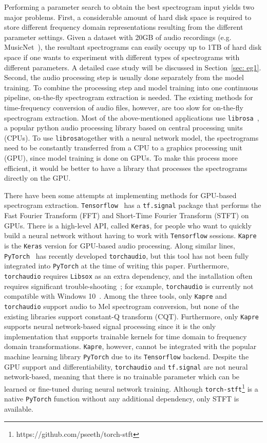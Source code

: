 \documentclass{ieeeaccess}
\newcommand{\nbh}[1]{\texttt{#1}}
\begin{document}
Performing a parameter search to obtain the best spectrogram input yields two major problems. First, a considerable amount of hard disk space is required to store different frequency domain representations resulting from the different parameter settings. Given a dataset with 20GB of audio recordings (e.g. MusicNet~\cite{thickstun2017learning}), the resultant spectrograms can easily occupy up to 1TB of hard disk space {if one wants to experiment with different types of spectrograms with different parameters}. {A detailed case study will be discussed in Section~\ref{sec: eg1}. Second, the audio processing step is usually done separately from the model training. To combine the processing step and model training into one continuous pipeline, on-the-fly spectrogram extraction is needed.} The existing methods for time-frequency conversion of audio files, however, are too slow for on-the-fly spectrogram extraction. Most of the above-mentioned applications use \nbh{librosa}~\cite{mcfee2015Librosa}, a popular python audio processing library based on central processing units (CPUs). To use \nbh{librosa}together with a neural network model, the spectrograms need to be constantly transferred from a CPU to a graphics processing unit (GPU), since model training is done on GPUs. To make this process more efficient, it would be better to have a library that processes the spectrograms directly on the GPU.

{There have been some attempts at implementing methods for GPU-based spectrogram extraction. \nbh{Tensorflow}~\cite{Tensorflow2015-whitepaper} has a \nbh{tf.signal} package that performs the Fast Fourier Transform (FFT) and Short-Time Fourier Transform (STFT) on GPUs. There is a high-level API, called \nbh{Keras}, for people who want to quickly build a neural network without having to work with \nbh{Tensorflow} sessions. \nbh{Kapre}~\cite{choi2017kapre} is the \nbh{Keras} version for GPU-based audio processing. Along similar lines, \nbh{PyTorch}~\cite{paszke2017automatic} has recently developed \nbh{torchaudio}, but this tool has not been fully integrated into \nbh{PyTorch} at the time of writing this paper. Furthermore, \nbh{torchaudio} requires \nbh{Libsox} as an extra dependency, and the installation often requires significant trouble-shooting~\cite{torchaudio_mac}; for example, \nbh{torchaudio} is currently not compatible with Windows 10~\cite{torchaudio_win}. Among the three tools, only \nbh{Kapre} and \nbh{torchaudio} support audio to Mel spectrogram conversion, but none of the existing libraries support constant-Q transform (CQT). Furthermore, only \nbh{Kapre} supports neural network-based signal processing since it is the only implementation that supports trainable kernels for time domain to frequency domain transformations. \nbh{Kapre}}, however, cannot be integrated with the popular machine learning library \nbh{PyTorch} {due to its \nbh{Tensorflow} backend}. {Despite the GPU support and differentiability}, \nbh{torchaudio} and \nbh{tf.signal} are not neural network-based, meaning that {there is no trainable parameter which can be learned or fine-tuned during neural network training. Although \nbh{torch-stft}\footnote{https://github.com/pseeth/torch-stft} {is a native \nbh{PyTorch} function without any additional dependency,} only STFT is available.} 
\end{document}
